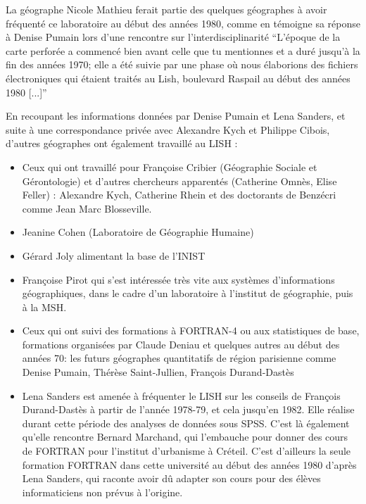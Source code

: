La géographe Nicole Mathieu ferait partie des quelques géographes à avoir fréquenté ce laboratoire au début des années 1980, comme en témoigne sa réponse à Denise Pumain lors d'une rencontre sur l'interdisciplinarité \enquote{L'époque de la carte perforée a commencé bien avant celle que tu mentionnes et a duré jusqu'à la fin des années 1970; elle a été suivie par une phase où nous élaborions des fichiers électroniques qui étaient traités au Lish, boulevard Raspail au début des années 1980 [...]} \autocite[154]{Mathieu2014}

En recoupant les informations données par Denise Pumain et Lena Sanders, et suite à une correspondance privée avec Alexandre Kych et Philippe Cibois, d'autres géographes ont également travaillé au LISH :

\begin{itemize}[label=\textbullet]

\item Ceux qui ont travaillé pour Françoise Cribier (Géographie Sociale et Gérontologie) et d'autres chercheurs apparentés (Catherine Omnès, Elise Feller) : Alexandre Kych, Catherine Rhein et des doctorants de Benzécri comme Jean Marc Blosseville.


\item Jeanine Cohen (Laboratoire de Géographie Humaine)

\item Gérard Joly alimentant la base de l'INIST

\item Françoise Pirot qui s'est intéressée très vite aux systèmes d'informations géographiques, dans le cadre d'un laboratoire à l’institut de géographie, puis à la MSH.

\item Ceux qui ont suivi des formations à FORTRAN-4 ou aux statistiques de base, formations organisées par Claude Deniau et quelques autres au début des années 70: les futurs géographes quantitatifs de région parisienne comme Denise Pumain, Thérèse Saint-Jullien, François Durand-Dastès

\item Lena Sanders est amenée à fréquenter le LISH sur les conseils de François Durand-Dastès à partir de l'année 1978-79, et cela jusqu'en 1982. Elle réalise durant cette période des analyses de données sous SPSS. C'est là également qu'elle rencontre Bernard Marchand, qui l'embauche pour donner des cours de FORTRAN pour l'institut d'urbanisme à Créteil. C'est d'ailleurs la seule formation FORTRAN dans cette université au début des années 1980 d'après Lena Sanders, qui raconte avoir dû adapter son cours pour des élèves informaticiens non prévus à l'origine.
\end{itemize}

